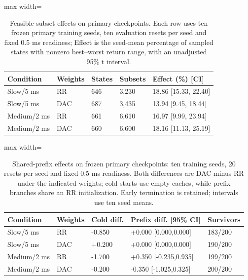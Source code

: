 \documentclass[10pt]{article}
\begin{document}
\begin{table}[!t]\centering\setlength{\tabcolsep}{3pt}\footnotesize
\caption{Feasible-subset effects on primary checkpoints. Each row uses ten frozen primary training seeds, ten evaluation resets per seed and fixed 0.5 ms readiness; Effect is the seed-mean percentage of sampled states with nonzero best--worst return range, with an unadjusted 95\% t interval.}\label{tab:new_fresh}
\vspace{3mm}
\begin{adjustbox}{max width=\linewidth}\begin{tabular}{lllll}\toprule
Condition & Weights & States & Subsets & Effect (\%) [CI]\\\midrule
Slow/5 ms & RR & 646 & 3,230 & 18.86 [15.33, 22.40]\\
Slow/5 ms & DAC & 687 & 3,435 & 13.94 [9.45, 18.44]\\
Medium/2 ms & RR & 661 & 6,610 & 16.97 [9.99, 23.94]\\
Medium/2 ms & DAC & 660 & 6,600 & 18.16 [11.13, 25.19]\\
\bottomrule\end{tabular}\end{adjustbox}\end{table}
\begin{table}[!t]\centering\setlength{\tabcolsep}{3pt}\footnotesize
\caption{Shared-prefix effects on frozen primary checkpoints: ten training seeds, 20 resets per seed and fixed 0.5 ms readiness. Both differences are DAC minus RR under the indicated weights; cold starts use empty caches, while prefix branches share an RR initialization. Early termination is retained; intervals use ten seed means.}\label{tab:new_prefix}
\begin{adjustbox}{max width=\linewidth}\begin{tabular}{lllll}\toprule
Condition & Weights & Cold diff. & Prefix diff. [95\% CI] & Survivors\\\midrule
Slow/5 ms & RR & -0.850 & +0.000 [0.000,0.000] & 183/200\\
Slow/5 ms & DAC & +0.200 & +0.000 [0.000,0.000] & 190/200\\
Medium/2 ms & RR & -1.700 & +0.350 [-0.235,0.935] & 199/200\\
Medium/2 ms & DAC & -0.200 & -0.350 [-1.025,0.325] & 200/200\\
\bottomrule\end{tabular}\end{adjustbox}\end{table}
\end{document}
